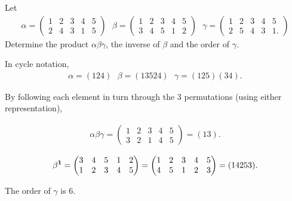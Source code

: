 \begin{example*}
  Let
  \begin{align*}
    \alpha =
    \begin{pmatrix}
      1 & 2 & 3 & 4 & 5\\
      2 & 4 & 3 & 1 & 5
    \end{pmatrix}
                      ~~~
                      \beta =
                      \begin{pmatrix}
                        1 & 2 & 3 & 4 & 5\\
                        3 & 4 & 5 & 1 & 2
                      \end{pmatrix}
                                        ~~~
                                        \gamma =
                                        \begin{pmatrix}
                                          1 & 2 & 3 & 4 & 5\\
                                          2 & 5 & 4 & 3 & 1.
                                        \end{pmatrix}
  \end{align*}
  Determine the product $\alpha\beta\gamma$, the inverse of $\beta$ and the order of $\gamma$.

  In cycle notation,
  \begin{align*}
    \alpha = (124) ~~~ \beta = (13524) ~~~ \gamma = (125)(34).
  \end{align*}

  By following each element in turn through the 3 permutations (using either representation),

  \begin{align*}
    \alpha\beta\gamma =
    \begin{pmatrix}
      1 & 2 & 3 & 4 & 5\\
      3 & 2 & 1 & 4 & 5
    \end{pmatrix} = (13).
  \end{align*}

  \begin{align*}
    \beta^{\mathbf 1} =
    \begin{pmatrix}
      3 & 4 & 5 & 1 & 2\\
      1 & 2 & 3 & 4 & 5
    \end{pmatrix}
                      =
                      \begin{pmatrix}
                         1 & 2 & 3 & 4 & 5\\
                         4 & 5 & 1 & 2 & 3
                      \end{pmatrix}
                                         = (14253).
  \end{align*}

  The order of $\gamma$ is 6.
\end{example*}


